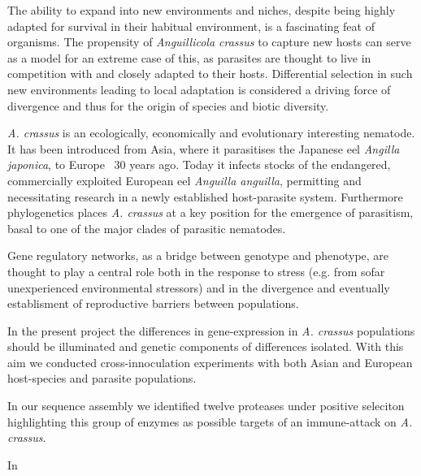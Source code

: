 


\begin{abstracts}        %

  The ability to expand into new environments and niches, despite
  being highly adapted for survival in their habitual environment, is
  a fascinating feat of organisms. The propensity of
  \textit{Anguillicola crassus} to capture new hosts can serve as a
  model for an extreme case of this, as parasites are thought to live
  in competition with and closely adapted to their hosts. Differential
  selection in such new environments leading to local adaptation is
  considered a driving force of divergence and thus for the origin of
  species and biotic diversity.

  \textit{A. crassus} is an ecologically, economically and
  evolutionary interesting nematode. It has been introduced from Asia,
  where it parasitises the Japanese eel \textit{Angilla japonica}, to
  Europe ~30 years ago. Today it infects stocks of the endangered,
  commercially exploited European eel \textit{Anguilla anguilla},
  permitting and necessitating research in a newly established
  host-parasite system. Furthermore phylogenetics places
  \textit{A. crassus} at a key position for the emergence of
  parasitism, basal to one of the major clades of parasitic nematodes.

  Gene regulatory networks, as a bridge between genotype and
  phenotype, are thought to play a central role both in the response
  to stress (e.g. from sofar unexperienced environmental stressors)
  and in the divergence and eventually establisment of reproductive
  barriers between populations.

  In the present project the differences in gene-expression in
  \textit{A. crassus} populations should be illuminated and genetic
  components of differences isolated. With this aim we conducted
  cross-innoculation experiments with both Asian and European
  host-species and parasite populations. 

  In our sequence assembly we identified twelve proteases under
  positive seleciton highlighting this group of enzymes as possible
  targets of an immune-attack on \textit{A. crassus}.
  
  In 






\end{abstracts}



     